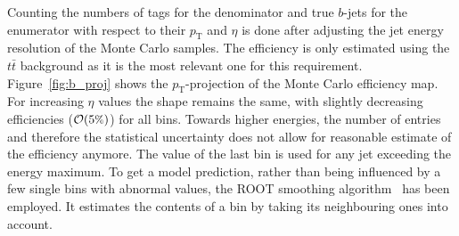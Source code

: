 Counting the numbers of tags for the denominator and true $b$-jets for the enumerator with respect to their $p_{\text{T}}$ and $\eta$ is done after adjusting the jet energy resolution of the Monte Carlo samples. The efficiency is only estimated using the $t\bar{t}$ background as it is the most relevant one for this requirement. Figure~\ref{fig:b_proj} shows the $p_{\text{T}}$-projection of the Monte Carlo efficiency map. For increasing $\eta$ values the shape remains the same, with slightly decreasing efficiencies ($\mathcal{O}(5\pct)$) for all bins. Towards higher energies, the number of entries and therefore the statistical uncertainty does not allow for reasonable estimate of the efficiency anymore. The value of the last bin is used for any jet exceeding the energy maximum. To get a model prediction, rather than being influenced by a few single bins with abnormal values, the \textsc{ROOT} smoothing algorithm~\cite{rootsmooth} has been employed. It estimates the contents of a bin by taking its neighbouring ones into account.

